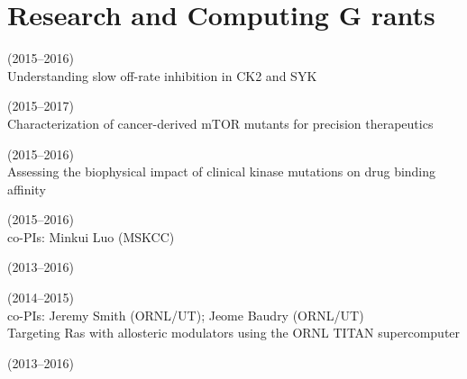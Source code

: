 \documentclass[10pt]{article}
\newcommand{\years}[1]{\marginpar{\quad \small #1}}
\begin{document}
%

\section*{Research and Computing G rants}

 (2015--2016) \\
{\small Understanding slow off-rate inhibition in CK2 and SYK} 

 (2015--2017) \\
{\small Characterization of cancer-derived mTOR mutants for precision therapeutics} 

 (2015--2016) \\
{\small Assessing the biophysical impact of clinical kinase mutations on drug binding affinity} 

 (2015--2016) \\
{\small co-PIs: Minkui Luo (MSKCC)} 

 (2013--2016)

 (2014--2015) \\
{\small co-PIs: Jeremy Smith (ORNL/UT); Jeome Baudry (ORNL/UT)} \\
{\small Targeting Ras with allosteric modulators using the ORNL TITAN supercomputer} 

 (2013--2016) 
\end{document}
